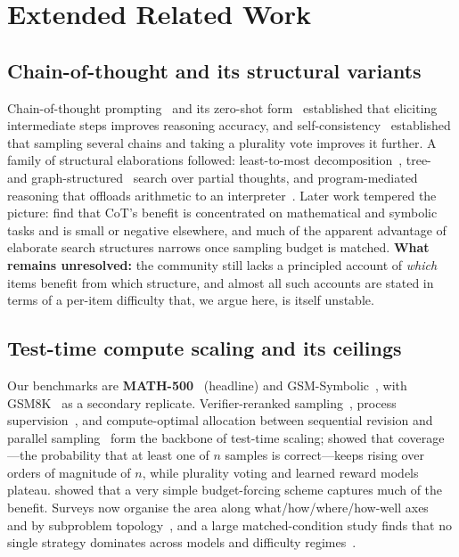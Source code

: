 \section{Extended Related Work}
\label{app:related}
\label{sec:related}

\subsection{Chain-of-thought and its structural variants}

Chain-of-thought prompting~\citep{wei2022cot} and its zero-shot
form~\citep{kojima2022zeroshot} established that eliciting intermediate steps
improves reasoning accuracy, and self-consistency~\citep{wang2023selfconsistency}
established that sampling several chains and taking a plurality vote improves
it further. A family of structural elaborations followed:
least-to-most decomposition~\citep{zhou2023leasttomost}, tree-~\citep{yao2023tot}
and graph-structured~\citep{besta2024got} search over partial thoughts, and
program-mediated reasoning that offloads arithmetic to an
interpreter~\citep{chen2023pot,gao2023pal}. Later work tempered the picture:
\citet{sprague2025tocot} find that CoT's benefit is concentrated on
mathematical and symbolic tasks and is small or negative elsewhere, and much of
the apparent advantage of elaborate search structures narrows once sampling
budget is matched. \textbf{What remains unresolved:} the community still lacks
a principled account of \emph{which} items benefit from which structure, and
almost all such accounts are stated in terms of a per-item difficulty that, we
argue here, is itself unstable.

\subsection{Test-time compute scaling and its ceilings}

Our benchmarks are \textbf{MATH-500}~\citep{math500} (headline) and
GSM-Symbolic~\citep{mirzadeh2025gsmsymbolic}, with GSM8K~\citep{cobbe2021gsm8k}
as a secondary replicate. Verifier-reranked sampling~\citep{cobbe2021gsm8k}, process
supervision~\citep{lightman2024verify,uesato2022process,wang2024mathshepherd},
and compute-optimal allocation between sequential revision and parallel
sampling~\citep{snell2024scaling,wu2024inference} form the backbone of
test-time scaling; \citet{brown2024monkeys} showed that coverage---the
probability that at least one of $n$ samples is correct---keeps rising over
orders of magnitude of $n$, while plurality voting and learned reward models
plateau. \citet{muennighoff2025s1} showed that a very simple budget-forcing
scheme captures much of the benefit. Surveys now organise the
area along what/how/where/how-well axes~\citep{zhang2025ttssurvey} and by
subproblem topology~\citep{subproblemsurvey2025}, and a large matched-condition
study finds that no single strategy dominates across models and difficulty
regimes~\citep{artofscaling2025}.

